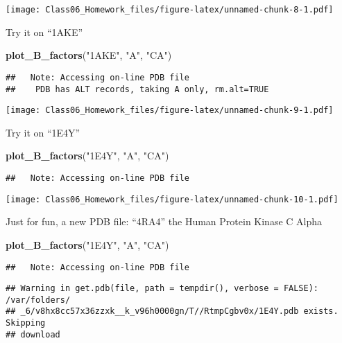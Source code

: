 \documentclass[]{article}
\newenvironment{Shaded}{\begin{snugshade}}{\end{snugshade}}
\newcommand{\KeywordTok}[1]{\textcolor[rgb]{0.13,0.29,0.53}{\textbf{{#1}}}}
\newcommand{\StringTok}[1]{\textcolor[rgb]{0.31,0.60,0.02}{{#1}}}
\newcommand{\NormalTok}[1]{{#1}}
\begin{document}
\texttt{[image: Class06\_Homework\_files/figure-latex/unnamed-chunk-8-1.pdf]}

Try it on ``1AKE''

\begin{Shaded}
\begin{Highlighting}[]
\KeywordTok{plot_B_factors}\NormalTok{(}\StringTok{"1AKE"}\NormalTok{, }\StringTok{"A"}\NormalTok{, }\StringTok{"CA"}\NormalTok{)}
\end{Highlighting}
\end{Shaded}

\begin{verbatim}
##   Note: Accessing on-line PDB file
##    PDB has ALT records, taking A only, rm.alt=TRUE
\end{verbatim}

\texttt{[image: Class06\_Homework\_files/figure-latex/unnamed-chunk-9-1.pdf]}

Try it on ``1E4Y''

\begin{Shaded}
\begin{Highlighting}[]
\KeywordTok{plot_B_factors}\NormalTok{(}\StringTok{"1E4Y"}\NormalTok{, }\StringTok{"A"}\NormalTok{, }\StringTok{"CA"}\NormalTok{)}
\end{Highlighting}
\end{Shaded}

\begin{verbatim}
##   Note: Accessing on-line PDB file
\end{verbatim}

\texttt{[image: Class06\_Homework\_files/figure-latex/unnamed-chunk-10-1.pdf]}

Just for fun, a new PDB file: ``4RA4'' the Human Protein Kinase C Alpha

\begin{Shaded}
\begin{Highlighting}[]
\KeywordTok{plot_B_factors}\NormalTok{(}\StringTok{"1E4Y"}\NormalTok{, }\StringTok{"A"}\NormalTok{, }\StringTok{"CA"}\NormalTok{)}
\end{Highlighting}
\end{Shaded}

\begin{verbatim}
##   Note: Accessing on-line PDB file
\end{verbatim}

\begin{verbatim}
## Warning in get.pdb(file, path = tempdir(), verbose = FALSE): /var/folders/
## _6/v8hx8cc57x36zzxk__k_v96h0000gn/T//RtmpCgbv0x/1E4Y.pdb exists. Skipping
## download
\end{verbatim}
\end{document}
